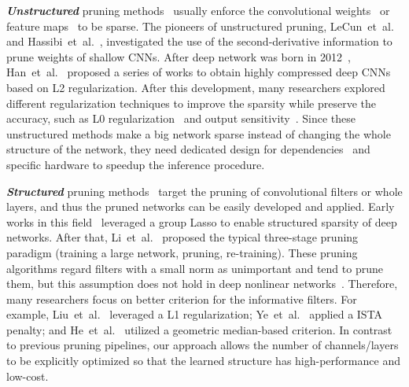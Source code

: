 \documentclass{article}
\begin{document}
\textit{\textbf{Unstructured}} pruning methods~\cite{lecun1990optimal,figurnov2017spatially,dong2017more,han2016deep} usually enforce the convolutional weights~\cite{lecun1990optimal,hassibi1993second} or feature maps~\cite{dong2017more,figurnov2017spatially} to be sparse.
The pioneers of unstructured pruning, LeCun~et~al.~\cite{lecun1990optimal} and Hassibi~et~al.~\cite{hassibi1993second}, investigated the use of the second-derivative information to prune weights of shallow CNNs.
After deep network was born in 2012~\cite{krizhevsky2012imagenet}, Han~et~al.~\cite{han2016deep,han2016learning,han2016eie} proposed a series of works to obtain highly compressed deep CNNs based on L2 regularization.
After this development, many researchers explored different regularization techniques to improve the sparsity while preserve the accuracy, such as L0 regularization~\cite{louizos2018learning} and output sensitivity~\cite{tartaglione2018learning}.
Since these unstructured methods make a big network sparse instead of changing the whole structure of the network, they need dedicated design for dependencies~\cite{han2016eie} and specific hardware to speedup the inference procedure.



\textit{\textbf{Structured}} pruning methods~\cite{li2017pruning,he2017channel,he2018soft,liu2019rethinking} target the pruning of convolutional filters or whole layers, and thus the pruned networks can be easily developed and applied.
Early works in this field~\cite{alvarez2016learning,wen2016learning} leveraged a group Lasso to enable structured sparsity of deep networks.
After that, Li~et~al.~\cite{li2017pruning} proposed the typical three-stage pruning paradigm (training a large network, pruning, re-training).
These pruning algorithms regard filters with a small norm as unimportant and tend to prune them, but this assumption does not hold in deep nonlinear networks~\cite{ye2018rethinking}. Therefore, many researchers focus on better criterion for the informative filters.
For example, Liu~et~al.~\cite{liu2017learning} leveraged a L1 regularization; Ye~et~al.~\cite{ye2018rethinking} applied a ISTA penalty; and He~et~al.~\cite{he2019pruning} utilized a geometric median-based criterion.
In contrast to previous pruning pipelines, our approach allows the number of channels/layers to be explicitly optimized so that the learned structure has high-performance and low-cost.
\end{document}
